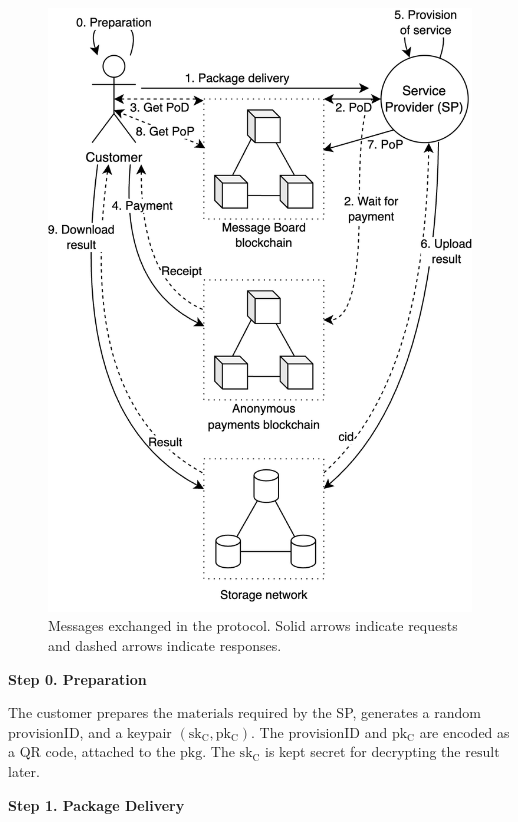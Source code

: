 \documentclass[pdftex,twocolumn,epjc3]{svjour3}
\begin{document}
\begin{figure}[ht!]
\includegraphics[width=\linewidth]{anonser-protocol.png}
\centering
\caption{Messages exchanged in the protocol. Solid arrows indicate requests and dashed arrows indicate responses.}
\label{fig:protocol-diagram}
\end{figure}

\noindent \textbf{Step 0. Preparation}\label{step-0-preparation}

The customer prepares the $\mathrm{materials}$ required by the SP, generates a random $\mathrm{provisionID}$, and a keypair $(\mathrm{sk_C},\mathrm{pk_C})$. The $\mathrm{provisionID}$ and $\mathrm{pk_C}$ are encoded as a QR code, attached to the $\mathrm{pkg}$. The $\mathrm{sk_C}$ is kept secret for decrypting the $\mathrm{result}$ later.

\noindent \textbf{Step 1. Package Delivery}\label{step-1-package-delivery}
\end{document}
